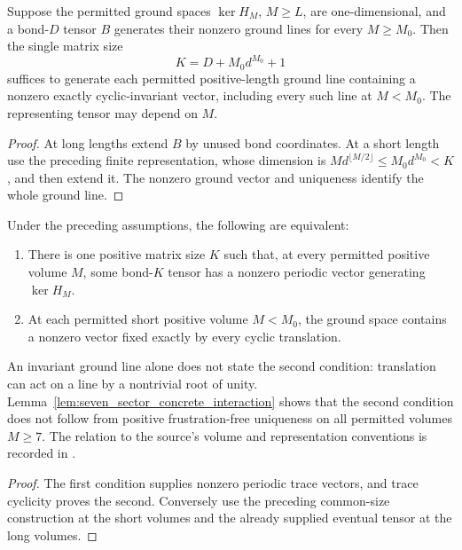 \begin{lemma}
    \label{lem:uniform_bond_cyclic_ground_sector}
    \leanok
    Suppose the permitted ground spaces $\ker H_M$, $M\ge L$, are
    one-dimensional, and a bond-$D$ tensor $B$ generates their nonzero
    ground lines for every $M\ge M_0$. Then the single matrix size
    \[
        K=D+M_0d^{M_0}+1
    \]
    suffices to generate each permitted positive-length ground line
    containing a nonzero exactly cyclic-invariant vector, including
    every such line at $M<M_0$. The representing tensor may depend
    on $M$.
\end{lemma}
\begin{proof}\leanok
    At long lengths extend $B$ by unused bond coordinates. At a short
    length use the preceding finite representation, whose dimension is
    $M d^{\lfloor M/2\rfloor}\le M_0d^{M_0}<K$, and then extend it.
    The nonzero ground vector and uniqueness identify the whole
    ground line.
\end{proof}

\begin{lemma}
    \label{lem:uniform_bond_finite_prefix_criterion}
    \leanok
    Under the preceding assumptions, the following are equivalent:
    \begin{enumerate}
        \item There is one positive matrix size $K$ such that, at
              every permitted positive volume $M$, some bond-$K$ tensor
              has a nonzero periodic vector generating $\ker H_M$.
        \item At each permitted short positive volume $M<M_0$, the
              ground space contains a nonzero vector fixed exactly by
              every cyclic translation.
    \end{enumerate}
    An invariant ground line alone does not state the second condition:
    translation can act on a line by a nontrivial root of unity.
    Lemma~\ref{lem:seven_sector_concrete_interaction} shows that the second
    condition does not follow from positive frustration-free uniqueness on
    all permitted volumes $M\ge7$. The relation to the source's volume and
    representation conventions is recorded in
    \cite{gap:spwc10_ground_state_dichotomy_quantifiers}.
\end{lemma}
\begin{proof}\leanok
    The first condition supplies nonzero periodic trace vectors, and
    trace cyclicity proves the second. Conversely use the preceding
    common-size construction at the short volumes and the already
    supplied eventual tensor at the long volumes.
\end{proof}

